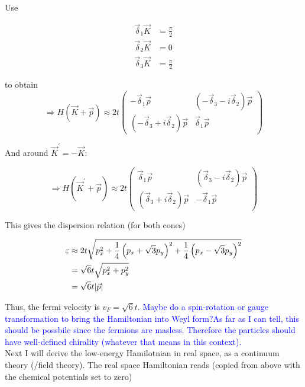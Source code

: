 \documentclass[../../../main.tex]{subfiles}
\begin{document}
Use 

\begin{align}
	\vec{\delta}_1\vec{K} &= \frac{\pi}{2} \\
	\vec{\delta}_2\vec{K} &=0 \\
	\vec{\delta}_3\vec{K} &= \frac{\pi}{2}
\end{align}

to obtain 
\begin{equation}
	\Rightarrow H(\vec{K} + \vec{p})  \approx 2t
	\begin{pmatrix}
		-\vec{\delta}_1\vec{p} & \left(-\vec{\delta}_3 -i \vec{\delta}_2\right)\vec{p} \\
		\left(-\vec{\delta}_3 +i \vec{\delta}_2\right)\vec{p}  & \vec{\delta}_1\vec{p}
	\end{pmatrix}
\end{equation}


And around $\vec{K}^\prime = -\vec{K}$:

\begin{equation}
	\Rightarrow H(\vec{K}^\prime + \vec{p})  \approx 2t
	\begin{pmatrix}
		\vec{\delta}_1\vec{p} & \left(\vec{\delta}_3 -i \vec{\delta}_2\right)\vec{p} \\
		\left(\vec{\delta}_3 +i \vec{\delta}_2\right)\vec{p}  & -\vec{\delta}_1\vec{p}
	\end{pmatrix}
\end{equation}


This gives the dispersion relation (for both cones)

\begin{align}
	\varepsilon &\approx 2t\sqrt{ p_x ^2 + \frac14\left(p_x + \sqrt{3}p_y\right)^2 + \frac14\left(p_x -  \sqrt{3}p_y\right)^2} \notag \\
	&= \sqrt{6}t \sqrt{ p_x^2 + p_y ^2} \notag\\
	&= \sqrt{6}t \abs{\vec{p}}
\end{align}

Thus, the fermi velocity is $v_F = \sqrt{6}t$. \textcolor{blue}{Maybe do a spin-rotation or gauge transformation to bring the Hamiltonian into Weyl form?As far as I can tell, this should be possbile since the fermions are masless. Therefore the particles should have well-defined chirality (whatever that means in this context).} \\

Next I will derive the low-energy Hamilotnian in real space, as a continuum theory (/field theory). The real space Hamiltonian reads (copied from above with the chemical potentials set to zero)
\end{document}
